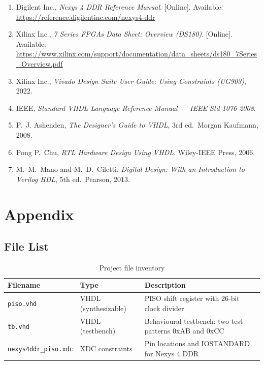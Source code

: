 \documentclass[12pt,a4paper]{report}
\begin{document}
\begin{enumerate}[leftmargin=1.5em]
  \item Digilent Inc., \textit{Nexys 4 DDR Reference Manual}. [Online]. Available: \url{https://reference.digilentinc.com/nexys4-ddr}
  \item Xilinx Inc., \textit{7 Series FPGAs Data Sheet: Overview (DS180)}. [Online]. Available: \url{https://www.xilinx.com/support/documentation/data_sheets/ds180_7Series_Overview.pdf}
  \item Xilinx Inc., \textit{Vivado Design Suite User Guide: Using Constraints (UG903)}, 2022.
  \item IEEE, \textit{Standard VHDL Language Reference Manual --- IEEE Std 1076-2008}.
  \item P.~J. Ashenden, \textit{The Designer's Guide to VHDL}, 3rd ed.\ Morgan Kaufmann, 2008.
  \item Pong P.~Chu, \textit{RTL Hardware Design Using VHDL}. Wiley-IEEE Press, 2006.
  \item M.~M.~Mano and M.~D.~Ciletti, \textit{Digital Design: With an Introduction to Verilog HDL}, 5th ed.\ Pearson, 2013.
\end{enumerate}

\chapter{Appendix}

\section{File List}

\begin{table}[H]
  \centering
  \caption{Project file inventory}
  \label{tab:filelist}
  \begin{tabularx}{\linewidth}{llX}
    \toprule
    \textbf{Filename} & \textbf{Type} & \textbf{Description} \\
    \midrule
    \texttt{piso.vhd}              & VHDL (synthesizable) & PISO shift register with 26-bit clock divider \\
    \texttt{tb.vhd}                & VHDL (testbench)     & Behavioural testbench: two test patterns 0xAB and 0xCC \\
    \texttt{nexys4ddr\_piso.xdc}   & XDC constraints      & Pin locations and IOSTANDARD for Nexys 4 DDR \\
    \bottomrule
  \end{tabularx}
\end{table}
\end{document}

